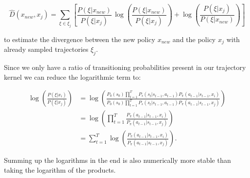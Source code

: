$$\hat{D}(x_{ new }, x_{ j }) = \sum _{\xi \in \xi_j} \left[\frac{P(\xi|x_{ new })}{P(\xi|x_{ j })}\,\log\left(\frac{P(\xi|x_{new})}{P(\xi|x_{j})}\right)+\log\left(\frac{P(\xi|x_{ j })}{P(\xi|x_{ new })}\right)\right] $$

to estimate the divergence between the new policy $x_{new}$ and the policy $x_j$ with already sampled trajectories $\xi_j$.

Since we only have a ratio of transitioning probabilities present in our trajectory kernel we can reduce the logarithmic term to:

\begin{align*}
    \log\left(\frac{P(\xi|x_i)}{P(\xi|x_j)}\right)
    &= \log\left(\frac{P_{0}(s_{0}) \prod_{t=1}^{T} P_s(s_{t}|s_{t-1},a_{t-1}) P_{\pi}(a_{t-1}|s_{t-1},x_i)}{P_{0}(s_{0}) \prod_{t=1}^{T} P_s(s_{t}|s_{t-1},a_{t-1}) P_{\pi}(a_{t-1}|s_{t-1},x_j)}\right)\\
    &= \log\left(\prod_{t=1}^{T}\frac{ P_{\pi}(a_{t-1}|s_{t-1},x_i)}{P_{\pi}(a_{t-1}|s_{t-1},x_j)}\right)\\
    &= \sum_{t=1}^{T} \log \left(\frac{P_{\pi}(a_{t-1}|s_{t-1},x_i)}{P_{\pi}(a_{t-1}|s_{t-1},x_j)}\right).
\end{align*}

Summing up the logarithms in the end is also numerically more stable than taking the logarithm of the products.
